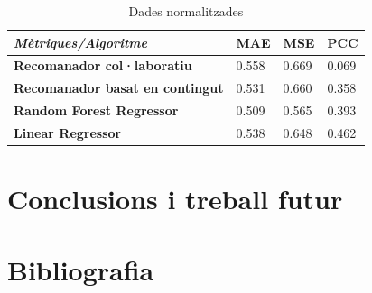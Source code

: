 \documentclass[12pt,a4paper,catalan]{article}
\begin{document}
\begin{table}[h]
\centering
\begin{tabular}{@{}llll@{}}
\toprule
\textit{\textbf{Mètriques/Algoritme}}   & \textbf{MAE} & \textbf{MSE} & \textbf{PCC} \\ \midrule
\textbf{Recomanador col·laboratiu}      & 0.558        & 0.669        & 0.069        \\
\textbf{Recomanador basat en contingut} & 0.531        & 0.660        & 0.358        \\
\textbf{Random Forest Regressor}        & 0.509        & 0.565        & 0.393        \\
\textbf{Linear Regressor}               & 0.538        & 0.648        & 0.462        \\ \bottomrule
\end{tabular}
\caption{Dades normalitzades}
\end{table}

\newpage
\section{Conclusions i treball futur}
\newpage
\section{Bibliografia}
\end{document}
